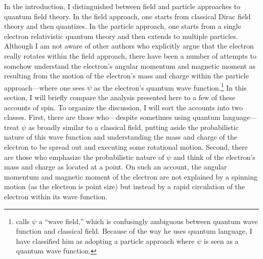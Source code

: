 \documentclass[12pt,secnumarabic,amsmath,amssymb,balancelastpage,nofootinbib]{article}
\begin{document}
In the introduction, I distinguished between field and particle approaches to quantum field theory.  In the field approach, one starts from classical Dirac field theory and then quantizes.  In the particle approach, one starts from a single electron relativistic quantum theory and then extends to multiple particles.  Although I am not aware of other authors who explicitly argue that the electron really rotates within the field approach, there have been a number of attempts to somehow understand the electron's angular momentum and magnetic moment as resulting from the motion of the electron's mass and charge within the particle approach---where one sees $\psi$ as the electron's quantum wave function.\footnote{\citet{ohanian} calls $\psi$ a ``wave field,'' which is confusingly ambiguous between quantum wave function and classical field.  Because of the way he uses quantum language, I have classified him as adopting a particle approach where $\psi$ is seen as a quantum wave function.}  In this section, I will briefly compare the analysis presented here to a few of these accounts of spin.  To organize the discussion, I will sort the accounts into two classes.  First, there are those who---despite sometimes using quantum language---treat $\psi$ as broadly similar to a classical field, putting aside the probabilistic nature of this wave function and understanding the mass and charge of the electron to be spread out and executing some rotational motion.  Second, there are those who emphasize the probabilistic nature of $\psi$ and think of the electron's mass and charge as located at a point.  On such an account, the angular momentum and magnetic moment of the electron are not explained by a spinning motion (as the electron is point size) but instead by a rapid circulation of the electron within its wave function.
\end{document}
